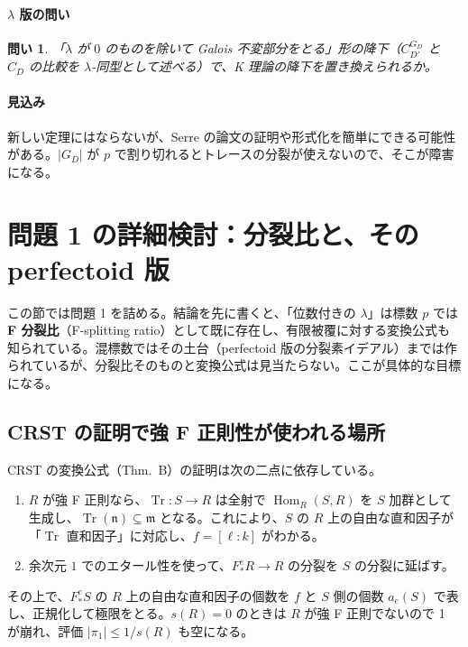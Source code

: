 \documentclass[11pt,a4paper]{ltjsarticle}
\theoremstyle{plain}
\newtheorem{question}{問い}
\theoremstyle{definition}
\theoremstyle{remark}
\theoremstyle{plain}
\newcommand{\m}{\mathfrak{m}}
\newcommand{\n}{\mathfrak{n}}
\newcommand{\Hom}{\operatorname{Hom}}
\newcommand{\Tr}{\operatorname{Tr}}
\begin{document}
\paragraph{$\lambda$ 版の問い}
\begin{question}
「$\lambda$ が $0$ のものを除いて Galois 不変部分をとる」形の降下（$C_{D'}^{G_D}$ と $C_D$ の比較を $\lambda$-同型として述べる）で、K 理論の降下を置き換えられるか。
\end{question}

\paragraph{見込み}
新しい定理にはならないが、Serre の論文の証明や形式化を簡単にできる可能性がある。$|G_D|$ が $p$ で割り切れるとトレースの分裂が使えないので、そこが障害になる。

\section{問題 1 の詳細検討：分裂比と、その perfectoid 版}\label{sec:p1}

この節では問題 1 を詰める。結論を先に書くと、「位数付きの $\lambda$」は標数 $p$ では \textbf{F 分裂比}（F-splitting ratio）として既に存在し、有限被覆に対する変換公式も知られている。混標数ではその土台（perfectoid 版の分裂素イデアル）までは作られているが、分裂比そのものと変換公式は見当たらない。ここが具体的な目標になる。

\subsection{CRST の証明で強 F 正則性が使われる場所}
CRST の変換公式（Thm.~B）の証明は次の二点に依存している。
\begin{enumerate}
  \item $R$ が強 F 正則なら、$\Tr\colon S\to R$ は全射で $\Hom_R(S,R)$ を $S$ 加群として生成し、$\Tr(\n)\subseteq\m$ となる。これにより、$S$ の $R$ 上の自由な直和因子が「$\Tr$ 直和因子」に対応し、$f = [\ell:k]$ がわかる。
  \item 余次元 $1$ でのエタール性を使って、$F^e_*R\to R$ の分裂を $S$ の分裂に延ばす。
\end{enumerate}
その上で、$F^e_*S$ の $R$ 上の自由な直和因子の個数を $f$ と $S$ 側の個数 $a_e(S)$ で表し、正規化して極限をとる。$s(R) = 0$ のときは $R$ が強 F 正則でないので 1 が崩れ、評価 $|\pi_1|\le 1/s(R)$ も空になる。
\end{document}
